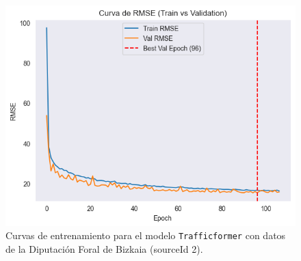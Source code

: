 \begin{figure}[H]
\begin{minipage}{0.48\textwidth}
		\vspace{0.2cm}
		\includegraphics[width=\linewidth]{includes/cap5/graphs/sid2_trafficformer_rmse.png}
	\end{minipage}
	\caption{Curvas de entrenamiento para el modelo \texttt{Trafficformer} con datos de la Diputación Foral de Bizkaia (sourceId 2).}
	\label{fig:curvas_sid2_trafficformer}
\end{figure}


